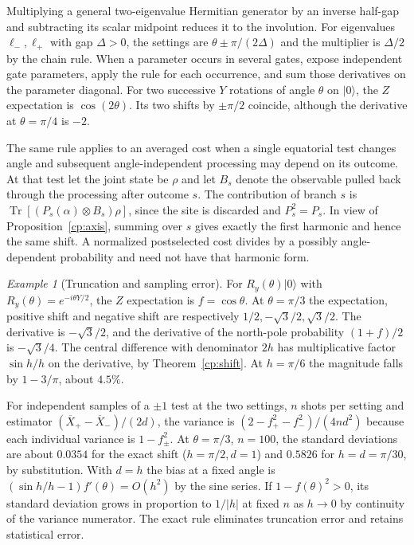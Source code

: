 \documentclass[aps,pra,onecolumn,superscriptaddress,nofootinbib,10pt]{revtex4-2}
\theoremstyle{definition}
\theoremstyle{remark}
\newtheorem{example}[theorem]{Example}
\begin{document}
Multiplying a general two-eigenvalue Hermitian generator by an inverse half-gap and subtracting its scalar midpoint reduces it to the involution. For eigenvalues $\ell_-,\ell_+$ with gap $\Delta>0$, the settings are $\theta\pm\pi/(2\Delta)$ and the multiplier is $\Delta/2$ by the chain rule. When a parameter occurs in several gates, expose independent gate parameters, apply the rule for each occurrence, and sum those derivatives on the parameter diagonal. For two successive $Y$ rotations of angle $\theta$ on $|0\rangle$, the $Z$ expectation is $\cos(2\theta)$. Its two shifts by $\pm\pi/2$ coincide, although the derivative at $\theta=\pi/4$ is $-2$.

The same rule applies to an averaged cost when a single equatorial test changes angle and subsequent angle-independent processing may depend on its outcome. At that test let the joint state be $\rho$ and let $B_s$ denote the observable pulled back through the processing after outcome $s$. The contribution of branch $s$ is $\operatorname{Tr}[(P_s(\alpha)\otimes B_s)\rho]$, since the site is discarded and $P_s^2=P_s$. In view of Proposition~\ref{cp:axis}, summing over $s$ gives exactly the first harmonic and hence the same shift. A normalized postselected cost divides by a possibly angle-dependent probability and need not have that harmonic form.

\begin{example}[Truncation and sampling error]\label{cp:shots}
For $R_y(\theta)|0\rangle$ with $R_y(\theta)=e^{-i\theta Y/2}$, the $Z$ expectation is $f=\cos\theta$. At $\theta=\pi/3$ the expectation, positive shift and negative shift are respectively $1/2,-\sqrt3/2,\sqrt3/2$. The derivative is $-\sqrt3/2$, and the derivative of the north-pole probability $(1+f)/2$ is $-\sqrt3/4$. The central difference with denominator $2h$ has multiplicative factor $\sin h/h$ on the derivative, by Theorem~\ref{cp:shift}. At $h=\pi/6$ the magnitude falls by $1-3/\pi$, about $4.5\%$.

For independent samples of a $\pm1$ test at the two settings, $n$ shots per setting and estimator $(\overline X_+-\overline X_-)/(2d)$, the variance is
$(2-f_+^2-f_-^2)/(4nd^2)$ because each individual variance is $1-f_\pm^2$. At $\theta=\pi/3$, $n=100$, the standard deviations are about $0.0354$ for the exact shift ($h=\pi/2,d=1$) and $0.5826$ for $h=d=\pi/30$, by substitution. With $d=h$ the bias at a fixed angle is $(\sin h/h-1)f'(\theta)=O(h^2)$ by the sine series. If $1-f(\theta)^2>0$, its standard deviation grows in proportion to $1/|h|$ at fixed $n$ as $h\to0$ by continuity of the variance numerator. The exact rule eliminates truncation error and retains statistical error.
\end{example}
\end{document}
